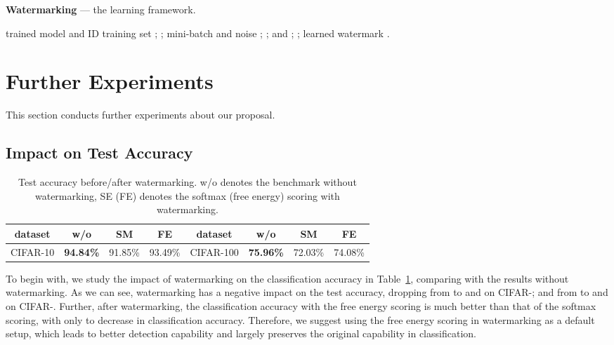 \documentclass{article}
\begin{document}
\begin{algorithm}[t]  
\caption{\textbf{Watermarking} --- the learning framework.} 
\label{alg: wm}
\begin{algorithmic}[1]
 trained model  and ID training set ;
\State ; \Comment{\textcolor{blue}{watermark initialization}}
    \State mini-batch  and noise ; \Comment{\textcolor{blue}{data sampling}}
    \State ;
    \Comment{\textcolor{blue}{risk calculation}}
     \State  and ;
    \Comment{\textcolor{blue}{gradient calculation}}
    \State ;
    \Comment{\textcolor{blue}{watermark updating}}
\EndFor
{} learned watermark . 
\end{algorithmic}
 \end{algorithm}


\section{Further Experiments} \label{sec: app exp}

This section conducts further experiments about our proposal. 



\subsection{Impact on Test Accuracy}


\begin{table}[t]
\centering
\caption{{Test accuracy before/after watermarking. w/o denotes the benchmark without watermarking, SE (FE) denotes the softmax (free energy) scoring with watermarking.}} \label{tab: accu}
\vspace{5pt}
\small
\begin{tabular}{c|ccc||c|ccc}
\toprule[1.5pt]
 dataset & {w/o} & {SM} & {FE} & dataset & {w/o} & {SM} & {FE} \\
\midrule[0.6pt]
CIFAR-10             & \textbf{94.84\%}                   & 91.85\%                  & 93.49\%                  & CIFAR-100             & \textbf{75.96\%}                   & 72.03\%                  & 74.08\%                  \\  
\bottomrule[1.5pt]    
\end{tabular}
\end{table}

{To begin with, we study the impact of watermarking on the classification accuracy in Table~\ref{tab: accu}, comparing with the results without watermarking.  As we can see, watermarking has a negative impact on the test accuracy, dropping from  to  and  on CIFAR-; and from  to  and  on CIFAR-. Further, after watermarking, the classification accuracy with the free energy scoring is much better than that of the softmax scoring, with only  to  decrease in classification accuracy. Therefore, we suggest using the free energy scoring in watermarking as a default setup, which leads to better detection capability and largely preserves the original capability in classification.}
\end{document}
